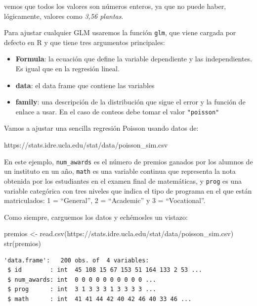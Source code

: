 \documentclass[
  letterpaper,
  DIV=11,
  numbers=noendperiod]{scrreprt}
\newenvironment{Shaded}{\begin{snugshade}}{\end{snugshade}}
\newcommand{\FunctionTok}[1]{\textcolor[rgb]{0.28,0.35,0.67}{#1}}
\newcommand{\NormalTok}[1]{\textcolor[rgb]{0.00,0.23,0.31}{#1}}
\newcommand{\OtherTok}[1]{\textcolor[rgb]{0.00,0.23,0.31}{#1}}
\newcommand{\StringTok}[1]{\textcolor[rgb]{0.13,0.47,0.30}{#1}}
\providecommand{\tightlist}{%
  \setlength{\itemsep}{0pt}\setlength{\parskip}{0pt}}\usepackage{longtable,booktabs,array}
\begin{document}
vemos que todos los valores son números enteros, ya que no puede haber,
lógicamente, valores como \emph{3,56 plantas}.

Para ajustar cualquier GLM usaremos la función \texttt{glm}, que viene
cargada por defecto en R y que tiene tres argumentos principales:

\begin{itemize}
\tightlist
\item
  \textbf{Formula}: la ecuación que define la variable dependiente y las
  independientes. Es igual que en la regresión lineal.
\item
  \textbf{data}: el data frame que contiene las variables
\item
  \textbf{family}: una descripción de la distribución que sigue el error
  y la función de enlace a usar. En el caso de conteos debe tomar el
  valor \texttt{"poisson"}
\end{itemize}

Vamos a ajustar una sencilla regresión Poisson usando datos de:

https://stats.idre.ucla.edu/stat/data/poisson\_sim.csv

En este ejemplo, \texttt{num\_awards} es el número de premios ganados
por los alumnos de un instituto en un año, \texttt{math} es una variable
continua que representa la nota obtenida por los estudiantes en el
examen final de matemáticas, y \texttt{prog} es una variable categórica
con tres niveles que indica el tipo de programa en el que están
matriculados: 1 = ``General'', 2 = ``Academic'' y 3 = ``Vocational''.

Como siempre, carguemos los datos y echémosles un vistazo:

\begin{Shaded}
\begin{Highlighting}[]
\NormalTok{premios }\OtherTok{\textless{}{-}} \FunctionTok{read.csv}\NormalTok{(}\StringTok{\textquotesingle{}https://stats.idre.ucla.edu/stat/data/poisson\_sim.csv\textquotesingle{}}\NormalTok{)}
\FunctionTok{str}\NormalTok{(premios)}
\end{Highlighting}
\end{Shaded}

\begin{verbatim}
'data.frame':   200 obs. of  4 variables:
 $ id        : int  45 108 15 67 153 51 164 133 2 53 ...
 $ num_awards: int  0 0 0 0 0 0 0 0 0 0 ...
 $ prog      : int  3 1 3 3 3 1 3 3 3 3 ...
 $ math      : int  41 41 44 42 40 42 46 40 33 46 ...
\end{verbatim}
\end{document}
